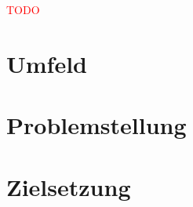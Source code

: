 \textcolor{red}{TODO}

\section{Umfeld}


\section{Problemstellung}


\section{Zielsetzung} \label{sec:zielsetzung} %

